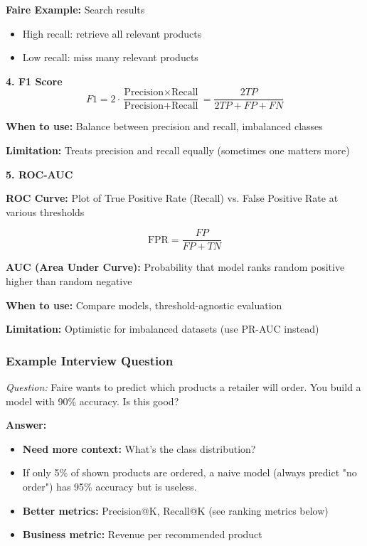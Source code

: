 \documentclass[11pt,letterpaper]{article}
\begin{document}
\textbf{Faire Example:} Search results
\begin{itemize}
    \item High recall: retrieve all relevant products
    \item Low recall: miss many relevant products
\end{itemize}

\textbf{4. F1 Score}
\begin{equation}
F1 = 2 \cdot \frac{\text{Precision} \times \text{Recall}}{\text{Precision} + \text{Recall}} = \frac{2TP}{2TP + FP + FN}
\end{equation}

\textbf{When to use:} Balance between precision and recall, imbalanced classes

\textbf{Limitation:} Treats precision and recall equally (sometimes one matters more)

\textbf{5. ROC-AUC}

\textbf{ROC Curve:} Plot of True Positive Rate (Recall) vs. False Positive Rate at various thresholds

\begin{equation}
\text{FPR} = \frac{FP}{FP + TN}
\end{equation}

\textbf{AUC (Area Under Curve):} Probability that model ranks random positive higher than random negative

\textbf{When to use:} Compare models, threshold-agnostic evaluation

\textbf{Limitation:} Optimistic for imbalanced datasets (use PR-AUC instead)

\subsubsection{Example Interview Question}

\textit{Question:} Faire wants to predict which products a retailer will order. You build a model with 90\% accuracy. Is this good?

\textbf{Answer:}
\begin{itemize}
    \item \textbf{Need more context:} What's the class distribution?
    \item If only 5\% of shown products are ordered, a naive model (always predict "no order") has 95\% accuracy but is useless.
    \item \textbf{Better metrics:} Precision@K, Recall@K (see ranking metrics below)
    \item \textbf{Business metric:} Revenue per recommended product
\end{itemize}
\end{document}
